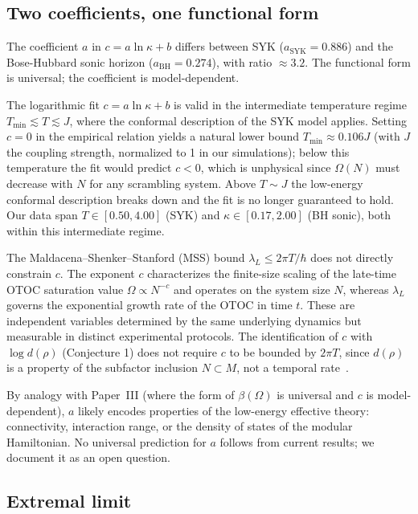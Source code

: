 \documentclass[aps,prl,twocolumn,superscriptaddress,showpacs]{revtex4-2}
\newcommand{\BH}{\mathrm{BH}}
\newcommand{\SYK}{\mathrm{SYK}}
\begin{document}
\subsection{Two coefficients, one functional form}

The coefficient $a$ in $c = a\ln\kappa + b$ differs between SYK
($a_\SYK = 0.886$) and the Bose-Hubbard sonic horizon ($a_\BH = 0.274$),
with ratio $\approx 3.2$. The functional form is universal; the coefficient
is model-dependent.

The logarithmic fit $c = a\ln\kappa + b$ is valid in the intermediate temperature 
regime $T_{\min} \lesssim T \lesssim J$, where the conformal description of the 
SYK model applies. Setting $c = 0$ in the empirical relation yields a natural lower 
bound $T_{\min} \approx 0.106J$ (with $J$ the coupling strength, normalized to 1 
in our simulations); below this temperature the fit would predict $c < 0$, which 
is unphysical since $\Omega(N)$ must decrease with $N$ for any scrambling system. 
Above $T \sim J$ the low-energy conformal description breaks down and the fit is 
no longer guaranteed to hold. Our data span $T \in [0.50, 4.00]$ (SYK) and 
$\kappa \in [0.17, 2.00]$ (BH sonic), both within this intermediate regime.
 
The Maldacena--Shenker--Stanford (MSS) bound $\lambda_L \leq 2\pi T/\hbar$ does 
not directly constrain $c$. The exponent $c$ characterizes the finite-size scaling 
of the late-time OTOC saturation value $\Omega \propto N^{-c}$ and operates on the 
system size $N$, whereas $\lambda_L$ governs the exponential growth rate of the 
OTOC in time $t$. These are independent variables determined by the same underlying 
dynamics but measurable in distinct experimental protocols. The identification of 
$c$ with $\log d(\rho)$ (Conjecture 1) does not require $c$ to be bounded by 
$2\pi T$, since $d(\rho)$ is a property of the subfactor inclusion $N \subset M$, 
not a temporal rate~\cite{TripathyCentroneDeffner2026}.

By analogy with Paper~III (where the form of $\beta(\Omega)$ is universal
and $c$ is model-dependent), $a$ likely encodes properties of the
low-energy effective theory: connectivity, interaction range, or the
density of states of the modular Hamiltonian. No universal prediction
for $a$ follows from current results; we document it as an open question.

\subsection{Extremal limit}
\end{document}
